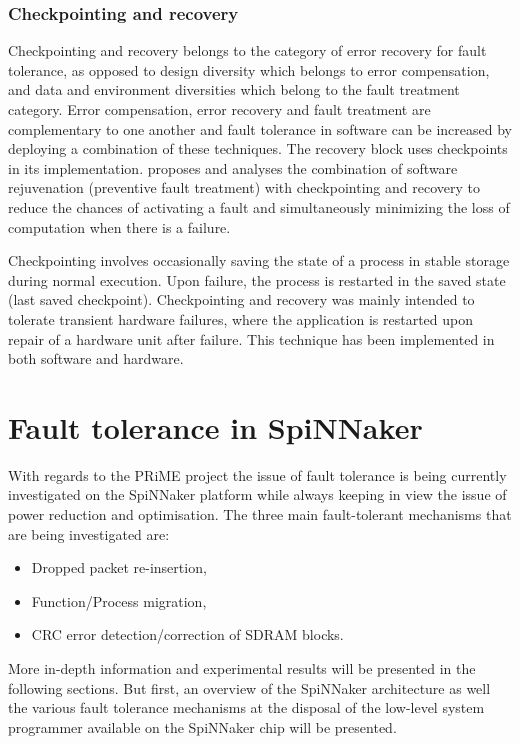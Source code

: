 \documentclass[a4paper, 11pt]{article}
\begin{document}
\subsubsection{Checkpointing and recovery}
Checkpointing and recovery \citep{kulkarni1990effects} belongs to the category of error recovery for fault tolerance, as opposed to design diversity which belongs to error compensation, and data and environment diversities which belong to the fault treatment category. Error compensation, error recovery and fault treatment are complementary to one another and fault tolerance in software can be increased by deploying a combination of these techniques. The recovery block uses checkpoints in its implementation. \citet{garg1996minimizing} proposes and analyses the combination of software rejuvenation (preventive fault treatment) with checkpointing and recovery to reduce the chances of activating a fault and simultaneously minimizing the loss of computation when there is a failure.

Checkpointing involves occasionally saving the state of a process in stable storage during normal execution. Upon failure, the process is restarted in the saved state (last saved checkpoint). Checkpointing and recovery was mainly intended to tolerate transient hardware failures, where the application is restarted upon repair of a hardware unit after failure. This technique has been implemented in both software and hardware.

\newpage
\section{Fault tolerance in SpiNNaker}
\label{sec:ft_spinnaker}

With regards to the PRiME project the issue of fault tolerance is being currently investigated on the SpiNNaker platform while always keeping in view the issue of power reduction and optimisation. The three main fault-tolerant mechanisms that are being investigated are:
\begin{itemize}
\item Dropped packet re-insertion,
\item Function/Process migration,
\item CRC error detection/correction of SDRAM blocks.
\end{itemize}
More in-depth information and experimental results will be presented in the following sections. But first, an overview of the SpiNNaker architecture as well the various fault tolerance mechanisms at the disposal of the low-level system programmer available on the SpiNNaker chip will be presented.
\end{document}
